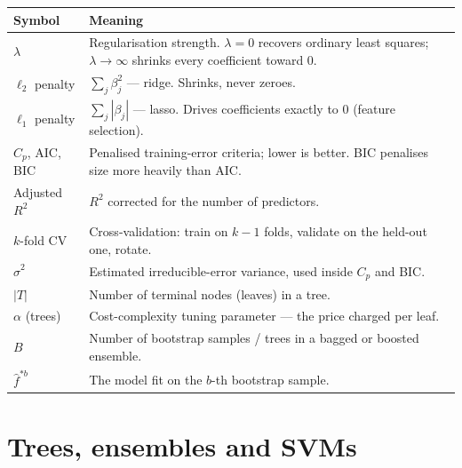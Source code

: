 \documentclass[10pt,letterpaper,onecolumn]{article}
\makeatletter
\newenvironment{symtab}
  {\begin{longtable}{@{}>{\raggedright\arraybackslash}p{0.26\textwidth}%
                       >{\raggedright\arraybackslash}p{0.70\textwidth}@{}}
   \toprule
   \textbf{Symbol} & \textbf{Meaning} \\
   \midrule
   \endhead
   \bottomrule
   \endfoot}
  {\end{longtable}}
\makeatother
\begin{document}
\begin{symtab}
$\lambda$ & Regularisation strength. $\lambda=0$ recovers ordinary least squares; $\lambda\to\infty$ shrinks every coefficient toward $0$. \\
$\ell_2$ penalty & $\sum_j \beta_j^2$ — ridge. Shrinks, never zeroes. \\
$\ell_1$ penalty & $\sum_j |\beta_j|$ — lasso. Drives coefficients exactly to $0$ (feature selection). \\
$C_p$, AIC, BIC & Penalised training-error criteria; lower is better. BIC penalises size more heavily than AIC. \\
Adjusted $R^2$ & $R^2$ corrected for the number of predictors. \\
$k$-fold CV & Cross-validation: train on $k-1$ folds, validate on the held-out one, rotate. \\
$\hat\sigma^2$ & Estimated irreducible-error variance, used inside $C_p$ and BIC. \\
$|T|$ & Number of terminal nodes (leaves) in a tree. \\
$\alpha$ (trees) & Cost-complexity tuning parameter — the price charged per leaf. \\
$B$ & Number of bootstrap samples / trees in a bagged or boosted ensemble. \\
$\hat f^{*b}$ & The model fit on the $b$-th bootstrap sample. \\
\end{symtab}

\section{Trees, ensembles and SVMs}
\end{document}
